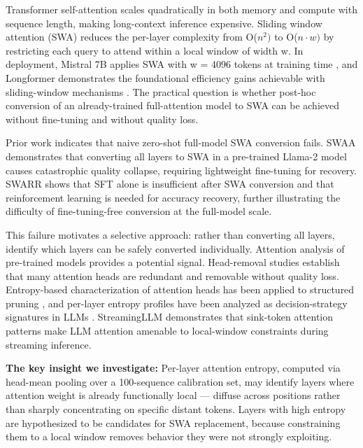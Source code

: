 
Transformer self-attention scales quadratically in both memory and compute with sequence length, making long-context inference expensive. Sliding window attention (SWA) reduces the per-layer complexity from O($n^{2})$ to O($n\cdot w)$ by restricting each query to attend within a local window of width w. In deployment, Mistral 7B applies SWA with w = 4096 tokens at training time \citep{Jiang2023Mistral}, and Longformer demonstrates the foundational efficiency gains achievable with sliding-window mechanisms \citep{Beltagy2020Longformer}. The practical question is whether post-hoc conversion of an already-trained full-attention model to SWA can be achieved without fine-tuning and without quality loss.

Prior work indicates that naive zero-shot full-model SWA conversion fails. SWAA \citep{Yu2025SWAA} demonstrates that converting all layers to SWA in a pre-trained Llama-2 model causes catastrophic quality collapse, requiring lightweight fine-tuning for recovery. SWARR \citep{Liu2026Architecture} shows that SFT alone is insufficient after SWA conversion and that reinforcement learning is needed for accuracy recovery, further illustrating the difficulty of fine-tuning-free conversion at the full-model scale.

This failure motivates a selective approach: rather than converting all layers, identify which layers can be safely converted individually. Attention analysis of pre-trained models provides a potential signal. Head-removal studies \citep{Michel2019Sixteen} establish that many attention heads are redundant and removable without quality loss. Entropy-based characterization of attention heads has been applied to structured pruning \citep{Choi2025Entropy}, and per-layer entropy profiles have been analyzed as decision-strategy signatures in LLMs \citep{Ali2025Entropy}. StreamingLLM \citep{Xiao2024StreamingLLM} demonstrates that sink-token attention patterns make LLM attention amenable to local-window constraints during streaming inference.

\textbf{The key insight we investigate:} Per-layer attention entropy, computed via head-mean pooling over a 100-sequence calibration set, may identify layers where attention weight is already functionally local --- diffuse across positions rather than sharply concentrating on specific distant tokens. Layers with high entropy are hypothesized to be candidates for SWA replacement, because constraining them to a local window removes behavior they were not strongly exploiting.

